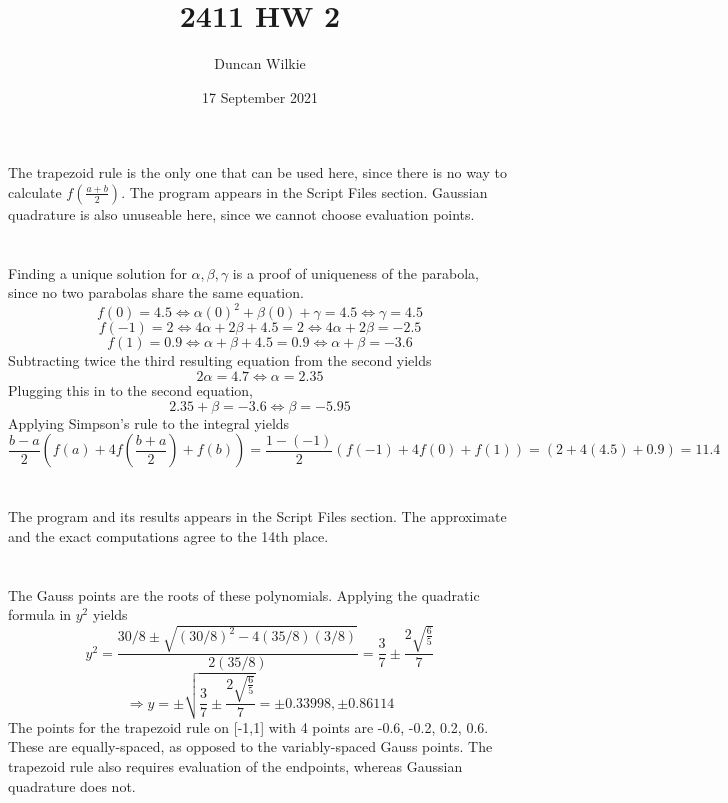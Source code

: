 \documentclass{article}
\title{2411 HW 2}
\author{Duncan Wilkie}
\date{17 September 2021}
\begin{document}
\maketitle

\section{}
The trapezoid rule is the only one that can be used here, since there is no way to calculate $f(\frac{a+b}{2})$.
The program appears in the Script Files section.
Gaussian quadrature is also unuseable here, since we cannot choose evaluation points.
\section{}
Finding a unique solution for $\alpha, \beta, \gamma$ is a proof of uniqueness of the parabola, since no two parabolas share the same equation.
\[f(0)=4.5\Leftrightarrow \alpha(0)^2+\beta(0)+\gamma = 4.5 \Leftrightarrow \gamma = 4.5\]
\[f(-1)=2\Leftrightarrow 4\alpha+2\beta + 4.5 = 2\Leftrightarrow 4\alpha+2\beta = -2.5\]
\[f(1)=0.9\Leftrightarrow \alpha+\beta + 4.5 = 0.9 \Leftrightarrow \alpha+\beta=-3.6\]
Subtracting twice the third resulting equation from the second yields
\[2\alpha = 4.7 \Leftrightarrow \alpha = 2.35\]
Plugging this in to the second equation,
\[2.35+\beta = -3.6\Leftrightarrow \beta = -5.95\]
Applying Simpson's rule to the integral yields
\[\frac{b-a}{2}\left(f(a)+4f\left(\frac{b+a}{2}\right)+f(b)\right)=\frac{1-(-1)}{2}\left(f(-1)+4f(0)+f(1)\right)=\left(2+4(4.5)+0.9\right)=11.4\]
\section{}
The program and its results appears in the Script Files section. The approximate and the exact computations agree to the 14th place.
\section{}
The Gauss points are the roots of these polynomials. Applying the quadratic formula in $y^2$ yields
\[y^2=\frac{30/8\pm\sqrt{(30/8)^2-4(35/8)(3/8)}}{2(35/8)}=\frac{3}{7}\pm\frac{2\sqrt{\frac{6}{5}}}{7}\]
\[\Rightarrow y = \pm\sqrt{\frac{3}{7}\pm\frac{2\sqrt{\frac{6}{5}}}{7}}=\pm0.33998, \pm0.86114\]
The points for the trapezoid rule on [-1,1] with 4 points are -0.6, -0.2, 0.2, 0.6. These are equally-spaced, as opposed to the variably-spaced Gauss points.
The trapezoid rule also requires evaluation of the endpoints, whereas Gaussian quadrature does not.
\end{document}
